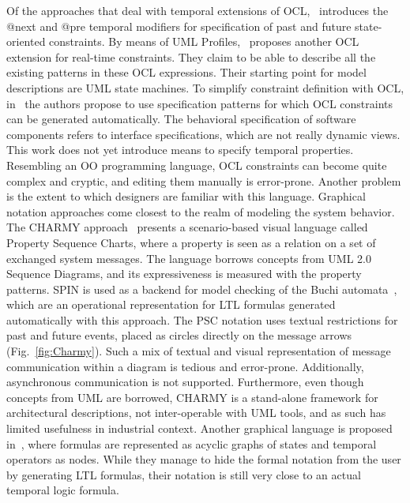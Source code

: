 \documentclass[letter]{llncs}
\begin{document}
Of the approaches that deal with temporal extensions of OCL,~\cite{Ziemann02anextension}
introduces the @next and @pre temporal modifiers for specification of past and future state-oriented constraints. 
By means of UML Profiles,~\cite{Flake03formalsemantics}
proposes another OCL extension for real-time constraints. They claim to be able to describe all the existing 
patterns in these OCL expressions. Their starting point for model descriptions are UML state machines.
To simplify constraint definition with OCL, in~\cite{Ackermann:2006:LOS:2135315.2135339} the authors 
propose to use specification patterns for which OCL constraints can be generated automatically.
The behavioral specification of software components refers to interface specifications,
which are not really dynamic views. This work does not yet introduce means to specify temporal properties.
Resembling an OO programming language, OCL constraints can become quite complex and cryptic, and editing 
them manually is error-prone. Another problem is the extent to which designers are familiar with this language.
Graphical notation approaches come closest to the realm of modeling the system behavior.
The CHARMY approach~\cite{Autili:2007:GSS:1290845.1290859} presents a scenario-based visual language called 
Property Sequence Charts, where a property is seen as a relation on a set of exchanged
system messages. The language borrows concepts from UML 2.0 Sequence Diagrams, and its expressiveness
is measured with the property patterns. SPIN is used as a backend for model checking of
the Buchi automata~\cite{Giannakopoulou:2001:AVT:872023.872506}, which are 
an operational representation for LTL formulas generated automatically with this approach.
The PSC notation uses textual restrictions for past and future events, placed as circles directly on the message arrows (Fig.~\ref{fig:Charmy}).
Such a mix of textual and visual representation of message communication
within a diagram is tedious and error-prone. Additionally, asynchronous communication is not supported.
Furthermore, even though concepts from UML are borrowed, CHARMY is a stand-alone framework for architectural descriptions,
not inter-operable with UML tools, and as such has limited usefulness in industrial context.
Another graphical language is proposed in~\cite{Lee97agraphical}, where formulas
are represented as acyclic graphs of states and temporal operators as nodes.
While they manage to hide the formal notation from the user by generating LTL formulas, 
their notation is still very close to an actual temporal logic formula.
\end{document}
